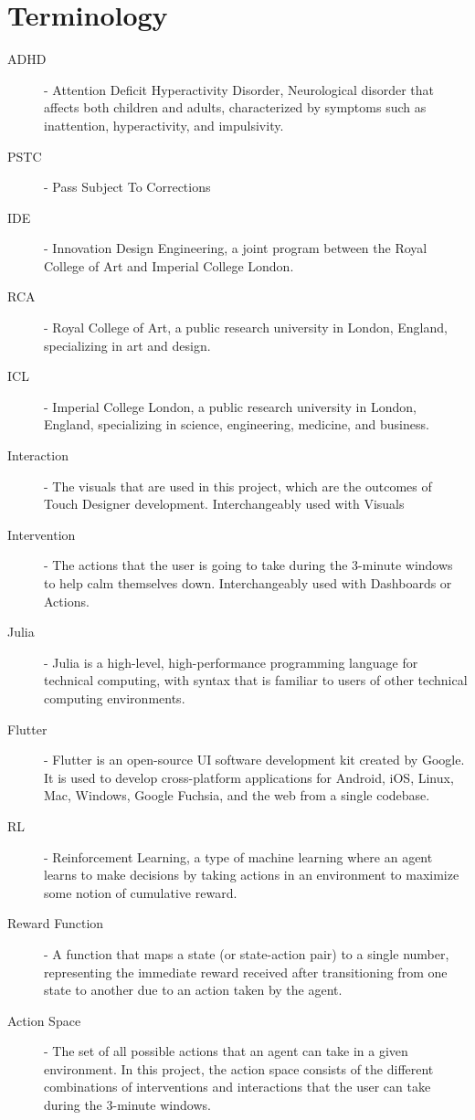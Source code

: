 \documentclass[
	fontsize=15pt,
	twoside=false,
	secnumdepth=2
]{kaobook}
\begin{document}
\chapter*{Terminology}
\begin{description}
  \item[ADHD] - Attention Deficit Hyperactivity Disorder, Neurological disorder that affects both children and adults, characterized by symptoms such as inattention, hyperactivity, and impulsivity.
  \item[PSTC] - Pass Subject To Corrections
  \item[IDE] - Innovation Design Engineering, a joint program between the Royal College of Art and Imperial College London.
  \item[RCA] - Royal College of Art, a public research university in London, England, specializing in art and design.
  \item[ICL] - Imperial College London, a public research university in London, England, specializing in science, engineering, medicine, and business.
  \item[Interaction] - The visuals that are used in this project, which are the outcomes of Touch Designer development. Interchangeably used with Visuals
  \item[Intervention] - The actions that the user is going to take during the 3-minute windows to help calm themselves down. Interchangeably used with Dashboards or Actions.
  \item[Julia] - Julia is a high-level, high-performance programming language for technical computing, with syntax that is familiar to users of other technical computing environments.
  \item[Flutter] - Flutter is an open-source UI software development kit created by Google. It is used to develop cross-platform applications for Android, iOS, Linux, Mac, Windows, Google Fuchsia, and the web from a single codebase.
  \item[RL] - Reinforcement Learning, a type of machine learning where an agent learns to make decisions by taking actions in an environment to maximize some notion of cumulative reward.
  \item[Reward Function] - A function that maps a state (or state-action pair) to a single number, representing the immediate reward received after transitioning from one state to another due to an action taken by the agent.
  \item[Action Space] - The set of all possible actions that an agent can take in a given environment. In this project, the action space consists of the different combinations of interventions and interactions that the user can take during the 3-minute windows.

\end{description}
\end{document}
